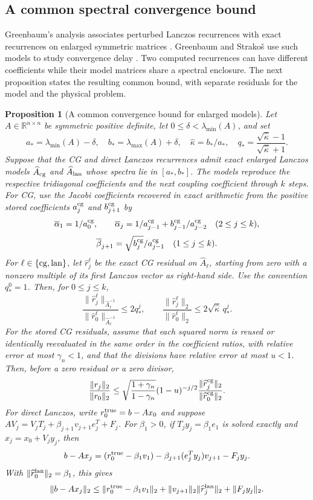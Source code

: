\documentclass[11pt]{article}
\newtheorem{proposition}{Proposition}
\theoremstyle{definition}
\newcommand{\R}{\mathbb{R}}
\begin{document}
\subsection{A common spectral convergence bound}
\label{sec:envelope}

Greenbaum's analysis associates perturbed Lanczos recurrences with exact
recurrences on enlarged symmetric matrices \cite{Greenbaum1989}.
Greenbaum and Strako\v{s} use such models to study convergence delay
\cite{GreenbaumStrakos1992}.  Two computed recurrences can have different
coefficients while their model matrices share a spectral enclosure.
The next proposition states the resulting common bound, with separate
residuals for the model and the physical problem.

\begin{proposition}[A common convergence bound for enlarged models]
\label{prop:envelope}
Let $A\in\R^{n\times n}$ be symmetric positive definite, let
$0\le\delta<\lambda_{\min}(A)$, and set
\[
 a_*=\lambda_{\min}(A)-\delta,\quad
 b_*=\lambda_{\max}(A)+\delta,\quad
 \widehat\kappa=b_*/a_*,\quad
 q_*=\frac{\sqrt{\widehat\kappa}-1}{\sqrt{\widehat\kappa}+1}.
\]
Suppose that the CG and direct Lanczos recurrences admit exact enlarged
Lanczos models $\widehat A_{\rm cg}$ and $\widehat A_{\rm lan}$ whose
spectra lie in $[a_*,b_*]$.  The models reproduce the respective
tridiagonal coefficients and the next coupling coefficient through $k$
steps.  For CG, use the Jacobi coefficients recovered in exact arithmetic
from the positive stored coefficients $a_j^{\rm cg}$ and $b_{j+1}^{\rm cg}$ by
\[
 \overline\alpha_1=1/a_0^{\rm cg},\qquad
 \overline\alpha_j=1/a_{j-1}^{\rm cg}
       +b_{j-1}^{\rm cg}/a_{j-2}^{\rm cg}\quad(2\le j\le k),
\]
\[
 \overline\beta_{j+1}=\sqrt{b_j^{\rm cg}}/a_{j-1}^{\rm cg}
 \quad(1\le j\le k).
\]
For $\ell\in\{{\rm cg},{\rm lan}\}$, let $\widehat r_j^\ell$ be the
exact CG residual on $\widehat A_\ell$, starting from zero with a
nonzero multiple of its first Lanczos vector as right-hand side.
Use the convention $q_*^0=1$.  Then, for $0\le j\le k$,
\[
 \frac{\|\widehat r_j^\ell\|_{\widehat A_\ell^{-1}}}
      {\|\widehat r_0^\ell\|_{\widehat A_\ell^{-1}}}
 \le2q_*^j,\qquad
 \frac{\|\widehat r_j^\ell\|_2}{\|\widehat r_0^\ell\|_2}
 \le2\sqrt{\widehat\kappa}\,q_*^j.
\]
For the stored CG residuals, assume that each squared norm is reused
or identically reevaluated in the same order in the coefficient ratios,
with relative error at most
$\gamma_n<1$, and that the divisions have relative error at most $u<1$.
Then, before a zero residual or a zero divisor,
\[
 \frac{\|r_j\|_2}{\|r_0\|_2}
 \le\sqrt{\frac{1+\gamma_n}{1-\gamma_n}}(1-u)^{-j/2}
 \frac{\|\widehat r_j^{\rm cg}\|_2}{\|\widehat r_0^{\rm cg}\|_2}.
\]
For direct Lanczos, write $r_0^{\rm true}=b-Ax_0$ and suppose
$AV_j=V_jT_j+\beta_{j+1}v_{j+1}e_j^T+F_j$.
For $\beta_1>0$, if $T_jy_j=\beta_1e_1$ is solved exactly and
$x_j=x_0+V_jy_j$, then
\[
 b-Ax_j=(r_0^{\rm true}-\beta_1v_1)
        -\beta_{j+1}(e_j^Ty_j)v_{j+1}-F_jy_j.
\]
With $\|\widehat r_0^{\rm lan}\|_2=\beta_1$, this gives
\[
 \|b-Ax_j\|_2\le\|r_0^{\rm true}-\beta_1v_1\|_2+
 \|v_{j+1}\|_2\|\widehat r_j^{\rm lan}\|_2+\|F_jy_j\|_2.
\]
\end{proposition}
\end{document}

